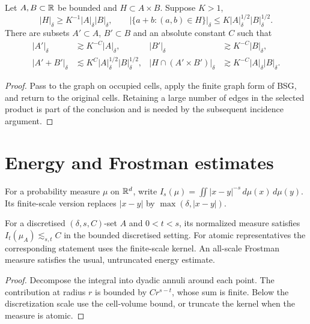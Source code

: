 \begin{proposition}
\label{prop:bsg}
Let $A,B\subset\mathbb{R}$ be bounded and $H\subset A\times B$. Suppose
$K>1$,
\[
 |H|_\delta\geq K^{-1}|A|_\delta|B|_\delta,
 \qquad
 |\{a+b:(a,b)\in H\}|_\delta
                   \leq K|A|_\delta^{1/2}|B|_\delta^{1/2}.
\]
There are subsets $A'\subset A$, $B'\subset B$ and an absolute
constant $C$ such that
\begin{align*}
 |A'|_\delta&\gtrsim K^{-C}|A|_\delta,&
 |B'|_\delta&\gtrsim K^{-C}|B|_\delta,\\
 |A'+B'|_\delta&\lesssim K^C|A|_\delta^{1/2}|B|_\delta^{1/2},&
 |H\cap(A'\times B')|_\delta&\gtrsim K^{-C}|A|_\delta|B|_\delta.
\end{align*}
\end{proposition}
\begin{proof}
Pass to the graph on occupied cells, apply the finite graph form of
BSG, and return to the original cells. Retaining a large number of
edges in the selected product is part of the conclusion and is
needed by the subsequent incidence argument.
\end{proof}

\section{Energy and Frostman estimates}

For a probability measure $\mu$ on $\mathbb{R}^d$, write
$I_s(\mu)=\iint|x-y|^{-s}\,d\mu(x)\,d\mu(y)$. Its finite-scale
version replaces $|x-y|$ by $\max(\delta,|x-y|)$.

\begin{lemma}
\label{lem:frostman-energy}
For a discretised $(\delta,s,C)$-set $A$ and $0<t<s$, its normalized
measure satisfies $I_t(\mu_A)\lesssim_{s,t}C$ in the bounded
discretised setting. For atomic representatives the corresponding
statement uses the finite-scale kernel. An all-scale Frostman
measure satisfies the usual, untruncated energy estimate.
\end{lemma}
\begin{proof}
Decompose the integral into dyadic annuli around each point. The
contribution at radius $r$ is bounded by $Cr^{s-t}$, whose sum is
finite. Below the discretization scale use the cell-volume bound,
or truncate the kernel when the measure is atomic.
\end{proof}

